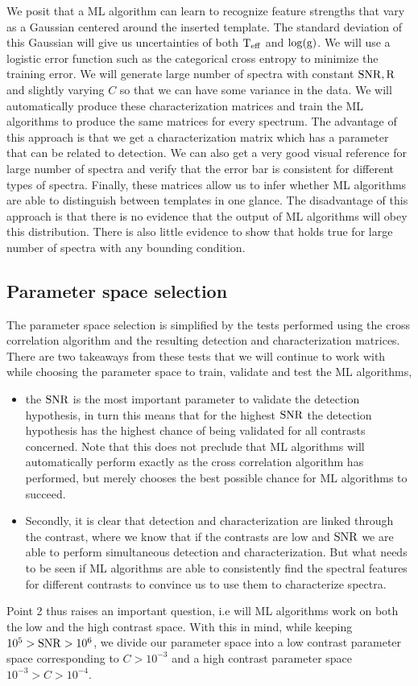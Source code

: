 We posit that a ML algorithm can learn to recognize feature strengths that vary as a Gaussian centered around the inserted template.
The standard deviation of this Gaussian will give us uncertainties of both $\rm{T_{eff}}$ and $\rm{\log(g)}$.
We will use a logistic error function such as the categorical cross entropy to minimize the training error.
We will generate large number of spectra with constant $\rm{SNR},R$ and slightly varying $C$ so that we can have some variance in the data.
We will automatically produce these characterization matrices and train the ML algorithms to produce the same matrices for every spectrum.
The advantage of this approach is that we get a characterization matrix which has a parameter that can be related to detection.
We can also get a very good visual reference for large number of spectra and verify that the error bar is consistent for different types of spectra.
Finally, these matrices allow us to infer whether ML algorithms are able to distinguish between templates in one glance.
The disadvantage of this approach is that there is no evidence that the output of ML algorithms will obey this distribution.
There is also little evidence to show that  holds true for large number of spectra with any bounding condition.

\subsection{Parameter space selection}
\label{subsec:paramspace}
The parameter space selection is simplified by the tests performed using the cross correlation algorithm and the resulting detection and characterization matrices.
There are two takeaways from these tests that we will continue to work with while choosing the parameter space to train, validate and test the ML algorithms,
\begin{itemize}
    \item the $\rm{SNR}$ is the most important parameter to validate the detection hypothesis, in turn this means that for the highest $\rm{SNR}$ the detection hypothesis has the highest chance of being validated for all contrasts concerned.
    Note that this does not preclude that ML algorithms will automatically perform exactly as the cross correlation algorithm has performed, but merely chooses the best possible chance for ML algorithms to succeed.
    \item Secondly, it is clear that detection and characterization are linked through the contrast, where we know that if the contrasts are low and $\rm{SNR}$ we are able to perform simultaneous detection and characterization. But what needs to be seen if ML algorithms are able to consistently find the spectral features for different contrasts to convince us to use them to characterize spectra.
\end{itemize}
Point 2 thus raises an important question, i.e will ML algorithms work on both the low and the high contrast space.
With this in mind, while keeping $10^{5}>\rm{SNR}>10^{6}$, we divide our parameter space into a low contrast parameter space corresponding to $C>10^{-3}$ and a high contrast parameter space $10^{-3}>C>10^{-4}$.
